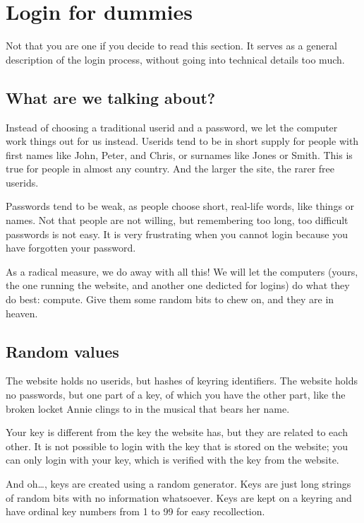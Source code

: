 \section{Login for dummies}
Not that you are one if you decide to read this section.
It serves as a general description of the login process,
without going into technical details too much.

\subsection{What are we talking about?}
Instead of choosing a traditional userid and a password,
we let the computer work things out for us instead.
Userids tend to be in short supply for people with first names like John, Peter, and Chris,
or surnames like Jones or Smith.
This is true for people in almost any country.
And the larger the site, the rarer free userids.
\par
Passwords tend to be weak,
as people choose short, real-life words, like things or names.
Not that people are not willing, but remembering too long, too difficult passwords is not easy.
It is very frustrating when you cannot login because you have forgotten your password.
\par
As a radical measure, we do away with all this!
We will let the computers
(yours, the one running the website, and another one dedicted for logins)
do what they do best: compute.
Give them some random bits to chew on, and they are in heaven.
\subsection{Random values}
The website holds no userids, but hashes of keyring identifiers.
The website holds no passwords, but one part of a key, of which you have the other part,
like the broken locket Annie clings to in the musical that bears her name.
\par
Your key is different from the key the website has, but they are related to each other.
It is not possible to login with the key that is stored on the website;
you can only login with your key, which is verified with the key from the website.
\par
And oh\ldots, keys are created using a random generator.
Keys are just long strings of random bits with no information whatsoever.
Keys are kept on a keyring and have ordinal key numbers from 1 to 99 for easy recollection.
